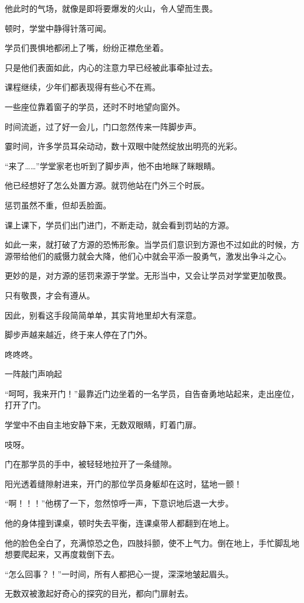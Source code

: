\begin{this_body}
他此时的气场，就像是即将要爆发的火山，令人望而生畏。

顿时，学堂中静得针落可闻。

学员们畏惧地都闭上了嘴，纷纷正襟危坐着。

只是他们表面如此，内心的注意力早已经被此事牵扯过去。

课程继续，少年们都表现得有些心不在焉。

一些座位靠着窗子的学员，还时不时地望向窗外。

时间流逝，过了好一会儿，门口忽然传来一阵脚步声。

霎时间，许多学员耳朵动动，数十双眼中陡然绽放出明亮的光彩。

“来了……”学堂家老也听到了脚步声，他不由地眯了眯眼睛。

他已经想好了怎么处置方源。就罚他站在门外三个时辰。

惩罚虽然不重，但却丢脸面。

课上课下，学员们出门进门，不断走动，就会看到罚站的方源。

如此一来，就打破了方源的恐怖形象。当学员们意识到方源也不过如此的时候，方源带给他们的威慑力就会大降，他们心中就会平添一股勇气，激发出争斗之心。

更妙的是，对方源的惩罚来源于学堂。无形当中，又会让学员对学堂更加敬畏。

只有敬畏，才会有遵从。

因此，别看这手段简简单单，其实背地里却大有深意。

脚步声越来越近，终于来人停在了门外。

咚咚咚。

一阵敲门声响起

“呵呵，我来开门！”最靠近门边坐着的一名学员，自告奋勇地站起来，走出座位，打开了门。

学堂中不由自主地安静下来，无数双眼睛，盯着门扉。

吱呀。

门在那学员的手中，被轻轻地拉开了一条缝隙。

阳光透着缝隙射进来，开门的那位学员身躯却在这时，猛地一颤！

“啊！！！”他楞了一下，忽然惊呼一声，下意识地后退一大步。

他的身体撞到课桌，顿时失去平衡，连课桌带人都翻到在地上。

他的脸色全白了，充满惊恐之色，四肢抖颤，使不上气力。倒在地上，手忙脚乱地想要爬起来，又再度栽倒下去。

“怎么回事？！”一时间，所有人都把心一提，深深地皱起眉头。

无数双被激起好奇心的探究的目光，都向门扉射去。


\end{this_body}
